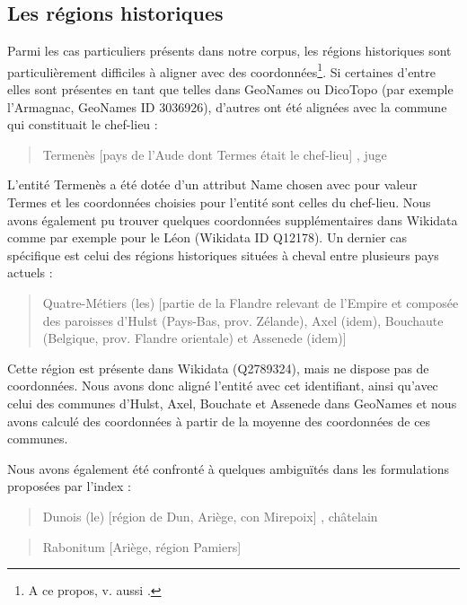 \documentclass[a4paper,12pt,twoside]{book}
\begin{document}
	\subsection{Les régions historiques}
	
	Parmi les cas particuliers présents dans notre corpus, les régions historiques sont particulièrement difficiles à aligner avec des coordonnées\footnote{A ce propos, v. aussi \cite{mcdonough_named_2019}.}. Si certaines d'entre elles sont présentes en tant que telles dans GeoNames ou DicoTopo (par exemple l'Armagnac, GeoNames ID 3036926), d'autres ont été alignées avec la commune qui constituait le chef-lieu :
	
	\begin{quotation}
		Termenès [pays de l'Aude dont Termes était le chef-lieu] ,
		juge
	\end{quotation}

	\noindent L'entité \og Termenès\fg{} a été dotée d'un attribut \og Name chosen\fg{} avec pour valeur \og Termes\fg{} et les coordonnées choisies pour l'entité  sont celles du chef-lieu. Nous avons également pu trouver quelques coordonnées supplémentaires dans Wikidata comme par exemple pour le Léon (Wikidata ID  Q12178). Un dernier cas spécifique est celui des régions historiques situées à cheval entre plusieurs pays actuels :
	
	\begin{quotation}
		Quatre-Métiers (les) [partie de la Flandre relevant de l'Empire
		et composée des paroisses d'Hulst (Pays-Bas, prov. Zélande), Axel (idem),
		Bouchaute (Belgique, prov. Flandre orientale) et Assenede (idem)]
	\end{quotation}

	\noindent Cette région est présente dans Wikidata (Q2789324), mais ne dispose pas de coordonnées. Nous avons donc aligné l'entité avec cet identifiant, ainsi qu'avec celui des communes d'Hulst, Axel, Bouchate et Assenede dans GeoNames et nous avons calculé des coordonnées à partir de la moyenne des coordonnées de ces communes.
	
	Nous avons également été confronté à quelques ambiguïtés dans les formulations proposées par l'index :
	
	\begin{quotation}
		Dunois (le) [région de Dun, Ariège, con Mirepoix] ,
		châtelain
	\end{quotation}

	\begin{quotation}
		Rabonitum [Ariège, région Pamiers]
	\end{quotation}
\end{document}
